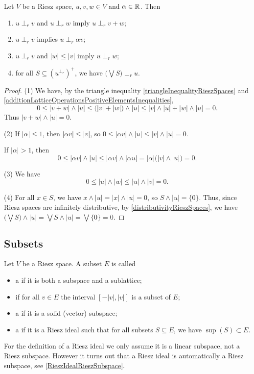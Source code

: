 \begin{lemma} \label{disjointComplementBandLemma}
Let $V$ be a Riesz space, $u,v,w\in V$ and $\alpha \in \mathbb{R}$. Then
\begin{enumerate}
\item $u\perp_r v$ and $u\perp_r w$ imply $u\perp_r v+w$;
\item $u\perp_r v$ implies $u\perp_r \alpha v$;
\item $u\perp_r v$ and $|w|\leq |v|$ imply $u\perp_r w$;
\item for all $S\subseteq (u^{\perp_r})^+$, we have $\big(\bigvee S\big) \perp_r u$.
\end{enumerate}
\end{lemma}
\begin{proof}
(1) We have, by the triangle inequality \ref{triangleInequalityRieszSpaces} and \ref{additionLatticeOperationsPositiveElementsInequalities},
\[ 0\leq |v+w|\wedge |u| \leq \big(|v| + |w|\big)\wedge |u| \leq |v|\wedge |u| + |w|\wedge |u| = 0.  \]
Thus $|v+w|\wedge |u| = 0$.

(2) If $|\alpha|\leq 1$, then $|\alpha v|\leq |v|$, so $0\leq |\alpha v|\wedge |u| \leq |v|\wedge |u| = 0$.

If $|\alpha| > 1$, then
\[ 0\leq |\alpha v|\wedge |u| \leq |\alpha v|\wedge |\alpha u| = |\alpha|\big(|v|\wedge |u|\big) = 0. \]

(3) We have
\[ 0\leq |u|\wedge |w| \leq |u|\wedge |v| = 0. \]

(4) For all $x\in S$, we have $x\wedge |u| = |x|\wedge |u| = 0$, so $S\wedge |u| = \{0\}$. Thus, since Riesz spaces are infinitely distributive, by \ref{distributivityRieszSpaces}, we have $\big(\bigvee S\big) \wedge |u| = \bigvee S\wedge |u| = \bigvee\{0\} = 0$. 
\end{proof}

\subsection{Subsets}
\begin{definition}
Let $V$ be a Riesz space. A subset $E$ is called
\begin{itemize}
\item a  if it is both a subspace and a sublattice;
\item {} if for all $v\in E$ the interval $[-|v|,|v|]$ is a subset of $E$;
\item a  if it is a solid (vector) subspace;
\item a  if it is a Riesz ideal such that for all subsets $S\subseteq E$, we have $\sup(S) \subset E$. 
\end{itemize}
\end{definition}
For the definition of a Riesz ideal we only assume it is a linear subspace, not a Riesz subspace. However it turns out that a Riesz ideal is automatically a Riesz subspace, see \ref{RieszIdealRieszSubspace}. 

